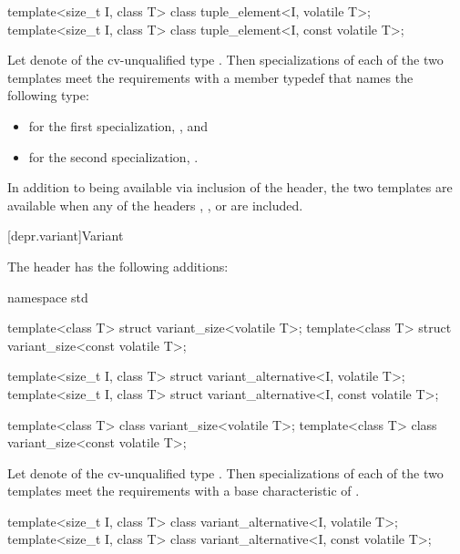 \begin{itemdecl}
template<size_t I, class T> class tuple_element<I, volatile T>;
template<size_t I, class T> class tuple_element<I, const volatile T>;
\end{itemdecl}

\begin{itemdescr}
\pnum
Let  denote 
of the cv-unqualified type .
Then specializations of each of the two templates meet
the  requirements
with a member typedef  that names the following type:
\begin{itemize}
\item for the first specialization, , and
\item for the second specialization, .
\end{itemize}

\pnum
In addition to being available via inclusion of the  header,
the two templates are available when any of the headers
,
, or
are included.
\end{itemdescr}

[depr.variant]{Variant}

\pnum
The header  has the following additions:
\begin{codeblock}
namespace std {
  template<class T> struct variant_size<volatile T>;
  template<class T> struct variant_size<const volatile T>;

  template<size_t I, class T> struct variant_alternative<I, volatile T>;
  template<size_t I, class T> struct variant_alternative<I, const volatile T>;
}
\end{codeblock}

\begin{itemdecl}
template<class T> class variant_size<volatile T>;
template<class T> class variant_size<const volatile T>;
\end{itemdecl}

\begin{itemdescr}
\pnum
Let  denote 
of the cv-unqualified type .
Then specializations of each of the two templates meet
the  requirements
with a base characteristic of .
\end{itemdescr}

\begin{itemdecl}
template<size_t I, class T> class variant_alternative<I, volatile T>;
template<size_t I, class T> class variant_alternative<I, const volatile T>;
\end{itemdecl}

